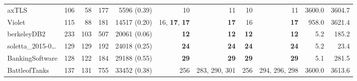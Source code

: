 \begin{table*}
\begin{tiny}
{{\begin{tabular}{lrrrrrrrrrr}
axTLS & \num[text-series-to-math=true]{106} & \num[text-series-to-math=true]{58} & \num[text-series-to-math=true]{177} & \num[text-series-to-math=true]{5596} (\num[text-series-to-math=true]{0.39}) & \num[text-series-to-math=true]{10} & \num[text-series-to-math=true]{11} & \num[text-series-to-math=true]{10} & \num[text-series-to-math=true]{11} & 3600.0 & 3604.7\\
Violet & \num[text-series-to-math=true]{115} & \num[text-series-to-math=true]{88} & \num[text-series-to-math=true]{181} & \num[text-series-to-math=true]{14517} (\num[text-series-to-math=true]{0.20}) & \num[text-series-to-math=true]{16}, \textbf{\num[text-series-to-math=true]{17}}, \textbf{\num[text-series-to-math=true]{17}} & \textbf{\num[text-series-to-math=true]{17}} & \num[text-series-to-math=true]{16} & \textbf{\num[text-series-to-math=true]{17}} & 958.0 & 3621.4\\
berkeleyDB2 & \num[text-series-to-math=true]{233} & \num[text-series-to-math=true]{103} & \num[text-series-to-math=true]{507} & \num[text-series-to-math=true]{20061} (\num[text-series-to-math=true]{0.06}) & \textbf{\num[text-series-to-math=true]{12}} & \textbf{\num[text-series-to-math=true]{12}} & \textbf{\num[text-series-to-math=true]{12}} & \textbf{\num[text-series-to-math=true]{12}} & 5.2 & 185.2\\
soletta\_2015-0\ldots & \num[text-series-to-math=true]{129} & \num[text-series-to-math=true]{129} & \num[text-series-to-math=true]{192} & \num[text-series-to-math=true]{24018} (\num[text-series-to-math=true]{0.25}) & \textbf{\num[text-series-to-math=true]{24}} & \textbf{\num[text-series-to-math=true]{24}} & \textbf{\num[text-series-to-math=true]{24}} & \textbf{\num[text-series-to-math=true]{24}} & 5.2 & 23.4\\
BankingSoftware & \num[text-series-to-math=true]{128} & \num[text-series-to-math=true]{122} & \num[text-series-to-math=true]{184} & \num[text-series-to-math=true]{29188} (\num[text-series-to-math=true]{0.55}) & \textbf{\num[text-series-to-math=true]{29}} & \textbf{\num[text-series-to-math=true]{29}} & \textbf{\num[text-series-to-math=true]{29}} & \textbf{\num[text-series-to-math=true]{29}} & 5.1 & 281.5\\
BattleofTanks & \num[text-series-to-math=true]{137} & \num[text-series-to-math=true]{131} & \num[text-series-to-math=true]{755} & \num[text-series-to-math=true]{33452} (\num[text-series-to-math=true]{0.38}) & \num[text-series-to-math=true]{256} & \num[text-series-to-math=true]{283}, \num[text-series-to-math=true]{290}, \num[text-series-to-math=true]{301} & \num[text-series-to-math=true]{256} & \num[text-series-to-math=true]{294}, \num[text-series-to-math=true]{296}, \num[text-series-to-math=true]{298} & 3600.0 & 3613.6\\

\end{tabular}}}
\end{tiny}
\end{table*}
